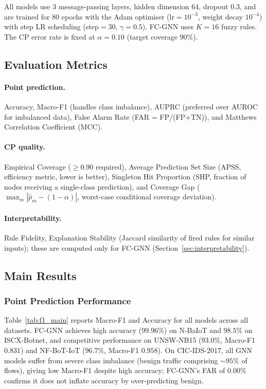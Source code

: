 All models use $3$ message-passing layers, hidden dimension $64$, dropout
$0.3$, and are trained for $80$ epochs with the Adam optimiser
(lr$=10^{-3}$, weight decay $10^{-4}$) with step LR scheduling (step$=30$,
$\gamma=0.5$).
FC-GNN uses $K=16$ fuzzy rules.
The CP error rate is fixed at $\alpha = 0.10$ (target coverage $90\%$).

\subsection{Evaluation Metrics}
\label{sec:metrics}

\paragraph{Point prediction.}
Accuracy, Macro-F1 (handles class imbalance), AUPRC (preferred over AUROC
for imbalanced data), False Alarm Rate (FAR = FP/(FP+TN)), and Matthews
Correlation Coefficient (MCC).

\paragraph{CP quality.}
Empirical Coverage ($\ge 0.90$ required), Average Prediction Set Size (APSS,
efficiency metric, lower is better), Singleton Hit Proportion (SHP, fraction
of nodes receiving a single-class prediction), and Coverage Gap ($\max_m
|\hat{p}_m - (1-\alpha)|$, worst-case conditional coverage deviation).

\paragraph{Interpretability.}
Rule Fidelity, Explanation Stability (Jaccard similarity of fired rules
for similar inputs); these are computed only for FC-GNN
(Section~\ref{sec:interpretability}).

\subsection{Main Results}

\subsubsection{Point Prediction Performance}

Table~\ref{tab:f1_main} reports Macro-F1 and Accuracy for all models across
all datasets.
FC-GNN achieves high accuracy ($99.96\%$) on N-BaIoT and $98.5\%$ on
ISCX-Botnet, and competitive performance on UNSW-NB15 ($93.0\%$,
Macro-F1 $0.831$) and NF-BoT-IoT ($96.7\%$, Macro-F1 $0.958$).
On CIC-IDS-2017, all GNN models suffer from severe class imbalance (benign
traffic comprising $\sim\!95\%$ of flows), giving low Macro-F1 despite high
accuracy; FC-GNN's FAR of $0.00\%$ confirms it does not inflate accuracy by
over-predicting benign.

